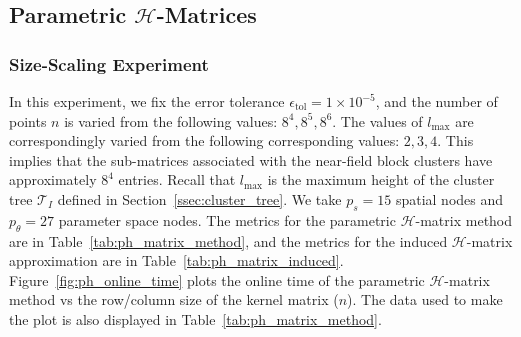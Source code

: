 \documentclass[final,3p,times]{elsarticle}
\newcommand{\mc}[1]{\mathcal{#1}}
\begin{document}
\subsection{Parametric \texorpdfstring{$\mc{H}$}{}-Matrices}\label{ssec:param_H_exp}


\subsubsection{Size-Scaling Experiment}\label{ssec:ph_size_scale}
In this experiment, we fix the error tolerance $\epsilon_{\text{tol}} = 1 \times 10^{-5}$, and 
 the number of points $n$ is varied from the following values: $8^4, 8^5, 8^6$. The values of $l_{\max}$ are correspondingly varied from the following corresponding values: $2, 3, 4$. 
 This implies that the sub-matrices associated with the near-field block clusters have approximately $8^{4}$ entries. Recall that $l_{\max}$ is the maximum height of the cluster tree $\mc{T}_{I}$ defined in Section~\ref{ssec:cluster_tree}. We take $p_{s} = 15$ spatial nodes and $p_{\theta} = 27$ parameter space nodes. The metrics for the parametric $\mc{H}$-matrix method are in Table~\ref{tab:ph_matrix_method}, and the metrics for the induced $\mc{H}$-matrix approximation are in Table~\ref{tab:ph_matrix_induced}. Figure~\ref{fig:ph_online_time} plots the online time of the parametric $\mc{H}$-matrix method vs the row/column size of the kernel matrix ($n$). The data used to make the plot is also displayed in Table~\ref{tab:ph_matrix_method}.
\end{document}
